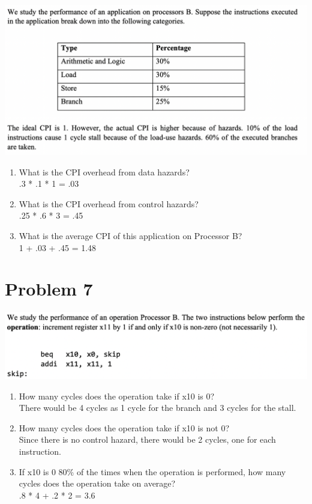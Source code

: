 \documentclass{article}
\begin{document}
\includegraphics[width = \textwidth]{images/Q6.png}

\begin{enumerate}
    \item What is the CPI overhead from data hazards? \\ .3 * .1 * 1 = .03
    \item What is the CPI overhead from control hazards? \\ .25 * .6 * 3 = .45
    \item What is the average CPI of this application on Processor B? \\ 1 + .03 + .45 = 1.48
\end{enumerate}

\section*{Problem 7}

\includegraphics[width = \textwidth]{images/Q7.png}

\begin{enumerate}
    \item How many cycles does the operation take if x10 is 0? \\ 
    There would be 4 cycles as 1 cycle for the branch and 3 cycles for the stall.
    \item How many cycles does the operation take if x10 is not 0? \\  
    Since there is no control hazard, there would be 2 cycles, one for each instruction.
    \item If x10 is 0 80\% of the times when the operation is performed, how many cycles does the
    operation take on average? \\ 
    .8 * 4 + .2 * 2 = 3.6
\end{enumerate}
\end{document}

